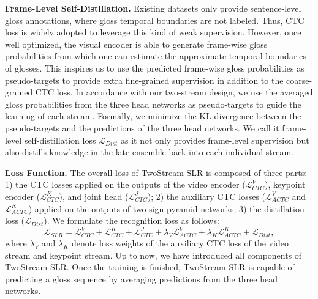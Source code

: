 \documentclass{article}
\begin{document}
\textbf{Frame-Level Self-Distillation.}
Existing datasets only provide sentence-level gloss annotations, where gloss temporal boundaries are not labeled. Thus, CTC~\cite{graves2006connectionist} loss is widely adopted to leverage this kind of weak supervision. However, once well optimized, the visual encoder is able to generate frame-wise gloss probabilities from which one can estimate the approximate temporal boundaries of glosses. This inspires us to use the predicted frame-wise gloss probabilities as pseudo-targets to provide extra fine-grained supervision in addition to the coarse-grained CTC loss. In accordance with our two-stream design, we use the averaged gloss probabilities from the three head networks as pseudo-targets to guide the learning of each stream. Formally, we minimize the KL-divergence between the pseudo-targets and the predictions of the three head networks. We call it frame-level self-distillation loss $\mathcal{L}_{Dist}$ as it not only provides frame-level supervision but also distills knowledge in the late ensemble back into each individual stream.



\textbf{Loss Function.}
The overall loss of TwoStream-SLR is composed of three parts: 1) the CTC losses applied on the outputs of the video encoder ($\mathcal{L}^V_{CTC}$), keypoint encoder ($\mathcal{L}^K_{CTC}$), and joint head ($\mathcal{L}^J_{CTC}$); 2) the auxiliary CTC losses ($\mathcal{L}^V_{ACTC}$ and $\mathcal{L}^K_{ACTC}$) applied on the outputs of two sign pyramid networks; 3) the distillation loss ($\mathcal{L}_{Dist}$). We formulate the recognition loss as follows:
\begin{equation}
\label{eq:loss_slr}
    \mathcal{L}_{SLR} = \mathcal{L}^V_{CTC} + \mathcal{L}^K_{CTC} + \mathcal{L}^J_{CTC} + \lambda_V \mathcal{L}^V_{ACTC} + \lambda_K \mathcal{L}^K_{ACTC} +  \mathcal{L}_{Dist},
\end{equation}
where $\lambda_V$ and $\lambda_K$ denote loss weights of the auxiliary CTC loss of the video stream and keypoint stream. Up to now, we have introduced all components of TwoStream-SLR. Once the training is finished, TwoStream-SLR is capable of predicting a gloss sequence by averaging predictions from the three head networks.
\end{document}
